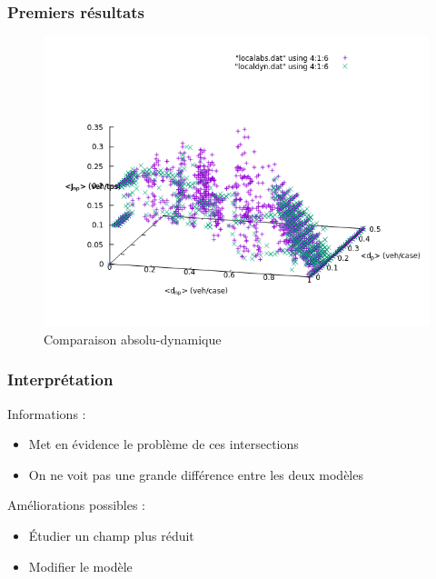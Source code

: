 \documentclass[slidetop,11pt]{beamer}
\begin{document}
\begin{frame}
	\frametitle{Premiers résultats}
	\begin{figure}
		\begin{center}
			\includegraphics[scale=0.4]{./diagrammes-fondamentaux/localabsdyn0w}
		\end{center}
	\caption{Comparaison absolu-dynamique}
	\end{figure}
\end{frame}

\begin{frame}
	\frametitle{Interprétation}
	Informations : 
		\begin{itemize}
			\item Met en évidence le problème de ces intersections
			\item On ne voit pas une grande différence entre les deux modèles		
		\end{itemize}
		
	Améliorations possibles :
		\begin{itemize}
			\item Étudier un champ plus réduit
			\item Modifier le modèle
		\end{itemize}

\end{frame}

\end{document}
